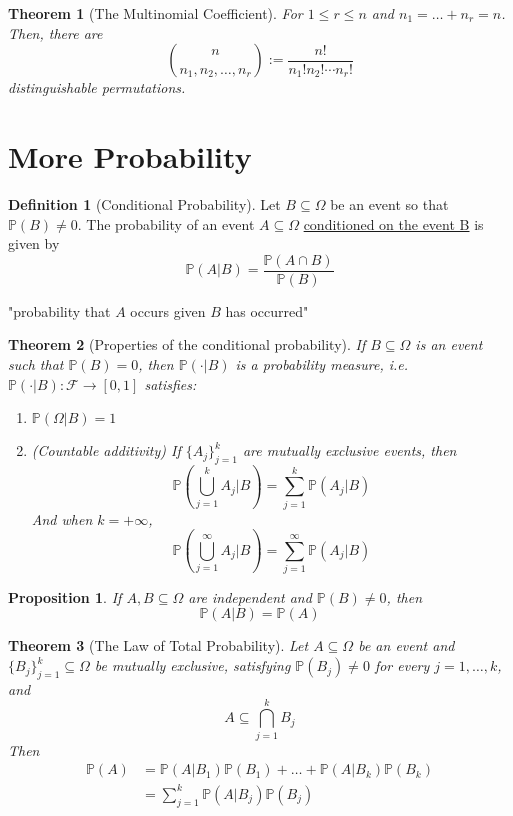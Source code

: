 \documentclass[
]{article}
\newtheorem{theorem}{Theorem}[section]
\newtheorem{proposition}{Proposition}[section]
\theoremstyle{definition}
\newtheorem{definition}{Definition}[section]
\theoremstyle{definition}
\theoremstyle{definition}
\theoremstyle{remark}
\newcommand{\prob}[1]{\mathbb{P}\left(#1\right)}
\begin{document}
\begin{theorem}[The Multinomial Coefficient]
  For $1\leq r\leq n$ and $n_1=\dots+n_r=n$. Then, there are
  \[{n\choose n_1,n_2,\dots,n_r}:=\frac{n!}{n_1!n_2!\cdots n_r!}\]
  distinguishable permutations.
\end{theorem}

\section{More Probability}

\begin{definition}[Conditional Probability]
  Let $B\subseteq\Omega$ be an event so that $\prob{B}\neq 0$. The probability of an event $A\subseteq\Omega$ \underline{conditioned on the event B} is given by \[\prob{A|B}=\frac{\prob{A\cap B}}{\prob{B}}\]
  \begin{center}"probability that $A$ occurs given $B$ has occurred"\end{center}
\end{definition}

\begin{theorem}[Properties of the conditional probability]
  If $B\subseteq\Omega$ is an event such that $\prob{B}=0$, then $\prob{\cdot|B}$ is a probability measure, i.e. $\prob{\cdot|B}:\mathcal{F}\to[0,1]$ satisfies:
  \begin{enumerate}
    \item $\prob{\Omega|B}=1$
    \item (Countable additivity) If $\{A_j\}_{j=1}^k$ are mutually exclusive events, then
          \[\prob{\bigcup_{j=1}^k A_j\bigg|B}=\sum_{j=1}^k\prob{A_j|B}\]
          And when $k=+\infty$,
          \[\prob{\bigcup_{j=1}^\infty A_j\bigg|B}=\sum_{j=1}^\infty\prob{A_j|B}\]
  \end{enumerate}
\end{theorem}

\begin{proposition}
  If $A,B\subseteq \Omega$ are independent and $\prob{B}\neq 0$, then \[\prob{A|B}=\prob{A}\]
\end{proposition}

\begin{theorem}[The Law of Total Probability]
  Let $A\subseteq\Omega$ be an event and $\{B_j\}_{j=1}^k\subseteq\Omega$ be mutually exclusive, satisfying $\prob{B_j}\neq 0$ for every $j=1,\dots,k$, and \[A\subseteq\bigcap_{j=1}^kB_j\]
  Then \begin{align*}
    \prob{A} & =\prob{A|B_1}\prob{B_1}+\dots+\prob{A|B_k}\prob{B_k} \\
             & =\sum_{j=1}^k\prob{A|B_j}\prob{B_j}                  \\
  \end{align*}
\end{theorem}
\end{document}
